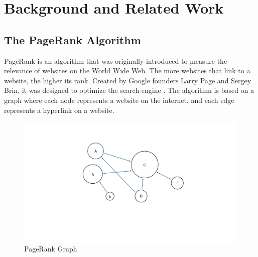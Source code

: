
\section{Background and Related Work}
\subsection{The PageRank Algorithm}



PageRank is an algorithm that was originally introduced to measure the relevance of websites on the World Wide Web. The more websites that link to a website, the higher its rank. Created by Google founders Larry Page and Sergey Brin, it was designed to optimize the search engine \cite{page_pagerank_1999}.
The algorithm is based on a graph where each node represents a website on the internet, and each edge represents a hyperlink on a website.
\begin{figure}[ht]
    \centering
    \includegraphics[width=0.7\linewidth]{images/PageRank Graph.pdf}
    \caption{PageRank Graph}
    \label{fig:pagerank-toy}
\end{figure}


